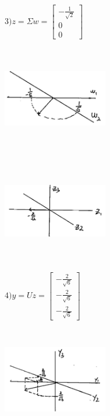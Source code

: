 \begin{example}
$ 3) z = \Sigma w = 
	\left[
	\begin{matrix}
	-\frac{1}{\sqrt{2}}\\
	0\\
	0
	\end{matrix}
	\right]
$
	
	\begin{marginfigure}
		\centering
		\includegraphics[width=1.8in,height=1.8in]{figures/ch05/figure1_b.jpg}
	\end{marginfigure}

	\begin{marginfigure}
		\centering
		\includegraphics[width=1.8in,height=1.8in]{figures/ch05/figure1_c.png}
	\end{marginfigure}

$ 4) y = Uz =  
	\left[
	\begin{matrix}
	-\frac{2}{\sqrt{6}}\\
	-\frac{2}{\sqrt{6}}\\
	-\frac{2}{\sqrt{6}}
	\end{matrix}
	\right]
$
	\begin{marginfigure}
		\centering
		\includegraphics[width=1.8in,height=1.8in]{figures/ch05/figure1_d.jpg}
	\end{marginfigure}
	

\end{example}

